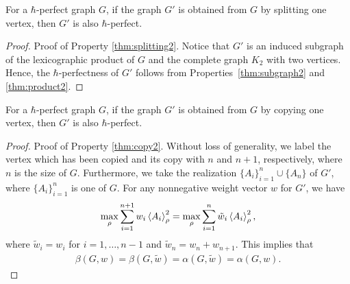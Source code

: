 \begin{prop}
\label{thm:splitting2}
For a $\hbar$-perfect graph $G$, if the graph $G'$ is obtained from $G$ by splitting one vertex, then $G'$ is also $\hbar$-perfect.
\end{prop}
\begin{proof} {Proof of Property \ref{thm:splitting2}.}
Notice that $G'$ is an induced subgraph of the lexicographic product of $G$ and the complete graph $K_2$ with two vertices. Hence, the $\hbar$-perfectness of $G'$ follows from Properties~\ref{thm:subgraph2} and \ref{thm:product2}.
\end{proof}

\begin{prop}
\label{thm:copy2}
For a $\hbar$-perfect graph $G$, if the graph $G'$ is obtained from $G$ by copying one vertex, then $G'$ is also $\hbar$-perfect.
\end{prop}

\begin{proof} {Proof of Property \ref{thm:copy2}.}
    Without loss of generality, we label the vertex which has been copied and its copy with $n$ and $n+1$, respectively, where $n$ is the size of $G$. Furthermore, we take the realization $\{A_i\}_{i=1}^n \cup \{A_n\}$ of $G'$, where $\{A_i\}_{i=1}^n$ is one of $G$. For any nonnegative weight vector $w$ for $G'$, we have
    \begin{equation}
        \max_{\rho} \sum_{i=1}^{n+1} w_i \left\langle A_i \right\rangle^2_{\rho} = \max_{\rho} \sum_{i=1}^n \tilde{w}_i \left\langle A_i \right\rangle^2_{\rho},
    \end{equation}
    where $\tilde{w}_i = w_i$ for $i=1, \ldots, n-1$ and $\tilde{w}_n = w_n + w_{n+1}$.
    This implies that
    \begin{align}
        \beta(G,w)  = \beta(G,\tilde{w}) = \alpha(G,\tilde{w}) = \alpha(G,w).
    \end{align}
\end{proof}




